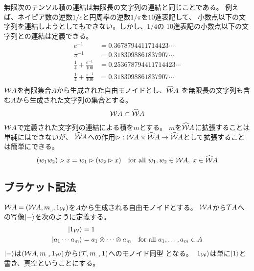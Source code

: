 	\begin{observation}[無限長の文字列の連結]
	\label{obs:無限長の文字列の連結} %
		無限次のテンソル積の連結は無限長の文字列の連結と同じことである。
		例えば、ネイピア数の逆数$1/e$と円周率の逆数$1/\pi$を$10$進表記して、
		小数点以下の文字列を連結しようとしてもできない。しかし、$1/4$の
		$10$進表記の小数点以下の文字列との連結は定義できる。
		\begin{equation*}\begin{split}
			e^{-1} &= 0.3678794411714423\cdots \\
			\pi^{-1} &= 0.3183098861837907\cdots \\
			\frac{1}{4} + \frac{e^{-1}}{100} &= 0.253678794411714423\cdots \\
			\frac{1}{4} + \frac{\pi^{-1}}{100} &= 0.3183098861837907\cdots \\
		\end{split}\end{equation*}
		${{\mathcal{W}}} A$を有限集合$A$から生成された自由モノイドとし、$\widehat{{{\mathcal{W}}}} A$
		を無限長の文字列も含む$A$から生成された文字列の集合とする。
		\begin{equation*}\begin{split}
			{\ensuremath{{\mathcal{W}}}} A\subset \widehat{{{\mathcal{W}}}} A
		\end{split}\end{equation*}
		${{\mathcal{W}}} A$で定義された文字列の連結による積を$m$とする。
		$m$を$\widehat{{{\mathcal{W}}}} A$に拡張することは単純にはできないが、
		$\widehat{{{\mathcal{W}}}} A$への作用$\rhd:{{\mathcal{W}}} A\times\widehat{{{\mathcal{W}}}} A\to\widehat{{{\mathcal{W}}}} A$として拡張すること
		は簡単にできる。
		\begin{equation*}\begin{split}
			(w_1w_2)\rhd x = w_1\rhd (w_2\rhd x)
			\quad\text{for all }w_1,w_2\in{\ensuremath{{\mathcal{W}}}} A,\; x\in \widehat{{{\mathcal{W}}}} A
		\end{split}\end{equation*}
	\end{observation} %
\subsection{ブラケット記法}\label{s2:ブラケット記法} %
	$\W A=(\W A,m_\myspace,1_\W)$を$A$から生成される自由モノイドとする。
	${{\mathcal{W}}} A$から${{\mathcal{T}}} A$への写像$\mathinner{|{-}\rangle}$を次のように定義する。
	\begin{equation*}\begin{split}
		\mathinner{|{1_{\ensuremath{{\mathcal{W}}}}}\rangle} &= 1 \\
		\mathinner{|{a_1\cdots a_m}\rangle} &= a_1\otimes\cdots\otimes a_m
		\quad\text{for all }a_1,\dots,a_m\in A
	\end{split}\end{equation*}
	$\mathinner{|{-}\rangle}$は$(\W A,m_\myspace,1_\W)$から$(\T,m_\myspace,1)$へのモノイド同型
	となる。
	$\mathinner{|{1_{\ensuremath{{\mathcal{W}}}}}\rangle}$は単に$\mathinner{|{1}\rangle}$と書き、真空ということにする。


